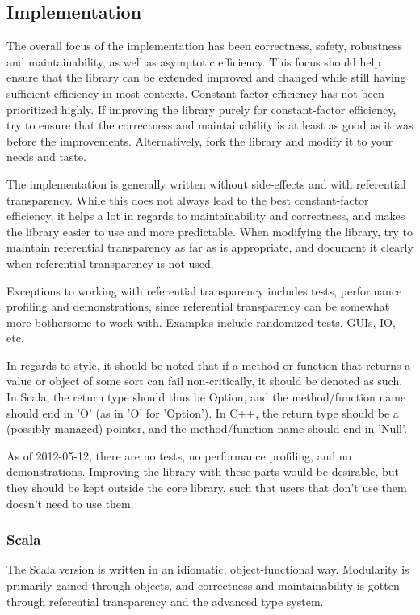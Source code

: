 
\subsection{Implementation}

The overall focus of the implementation has been correctness,
safety, robustness and maintainability, as well as asymptotic efficiency.
This focus should help ensure that the library can be extended
improved and changed while still having sufficient efficiency
in most contexts. Constant-factor efficiency has not been prioritized highly.
If improving the library purely for constant-factor efficiency,
try to ensure that the correctness and maintainability is at least
as good as it was before the improvements. Alternatively,
fork the library and modify it to your needs and taste.

The implementation is generally written without side-effects
and with referential transparency. While this does not always
lead to the best constant-factor efficiency,
it helps a lot in regards to maintainability and correctness,
and makes the library easier to use and more predictable.
When modifying the library, try to maintain referential transparency
as far as is appropriate, and document it clearly when referential
transparency is not used.

Exceptions to working with referential transparency
includes tests, performance profiling and demonstrations,
since referential transparency can be somewhat more bothersome
to work with. Examples include randomized tests, GUIs, IO, etc.

In regards to style, it should be noted that if a method or function
that returns a value or object of some sort can fail non-critically,
it should be denoted as such.
In Scala, the return type should thus be Option,
and the method/function name should end in 'O' (as in 'O' for 'Option').
In C++, the return type should be a (possibly managed) pointer,
and the method/function name should end in 'Null'.

As of 2012-05-12, there are no tests, no performance profiling,
and no demonstrations. Improving the library with these parts
would be desirable, but they should be kept outside the core library,
such that users that don't use them doesn't need to use them.

\subsubsection{Scala}

The Scala version is written in an idiomatic, object-functional way.
Modularity is primarily gained through objects,
and correctness and maintainability is gotten through referential
transparency and the advanced type system.

